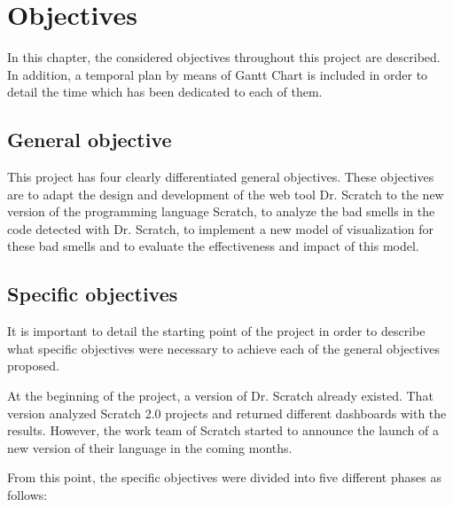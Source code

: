 

\chapter{Objectives} 
\label{chap:objectives} 

In this chapter, the considered objectives throughout this project are described. In addition, a temporal plan by means of Gantt Chart is included in order to detail the time which has been dedicated to each of them.

\section{General objective}
\label{sec:general-objective}

This project has four clearly differentiated general objectives. These objectives are to adapt the design and development of the web tool Dr. Scratch to the new version of the programming language Scratch, to analyze the bad smells in the code detected with Dr. Scratch, to implement a new model of visualization for these bad smells and to evaluate the effectiveness and impact of this model.



\section{Specific objectives}
\label{sec:specific-objectives}

It is important to detail the starting point of the project in order to describe what specific objectives were necessary to achieve each of the general objectives proposed. 

At the beginning of the project, a version of Dr. Scratch already existed. That version analyzed Scratch 2.0 projects and returned different dashboards with the results. However, the work team of Scratch started to announce the launch of a new version of their language in the coming months. 

From this point, the specific objectives were divided into five different phases as follows:

